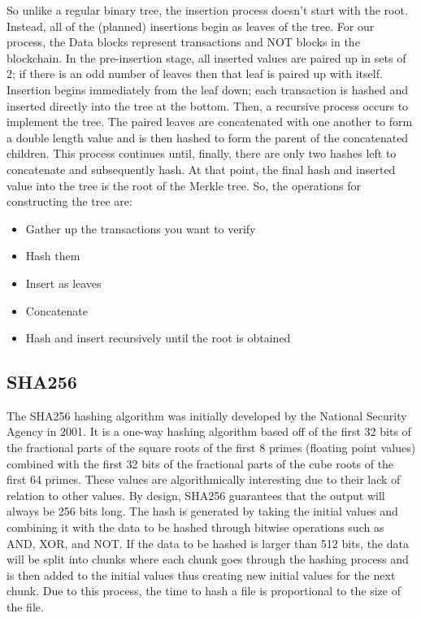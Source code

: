\documentclass[pdftex,11pt]{article}
\begin{document}
So unlike a regular binary tree, the insertion process doesn't start with the root. Instead, all of the (planned) insertions begin as leaves of the tree. For our process, the Data blocks represent transactions and NOT blocks in the blockchain. In the pre-insertion stage, all inserted values are paired up in sets of 2; if there is an odd number of leaves then that leaf is paired up with itself. Insertion begins immediately from the leaf down; each transaction is hashed and inserted directly into the tree at the bottom. Then, a recursive process occurs to implement the tree. The paired leaves are concatenated with one another to form a double length value and is then hashed to form the parent of the concatenated children. This process continues until, finally, there are only two hashes left to concatenate and subsequently hash. At that point, the final hash and inserted value into the tree is the root of the Merkle tree.
So, the operations for constructing the tree are:
\begin{itemize}
	\item Gather up the transactions you want to verify
	\item Hash them
	\item Insert as leaves
	\item Concatenate
	\item Hash and insert recursively until the root is obtained
\end{itemize}

\subsection{SHA256}
The SHA256 hashing algorithm was initially developed by the National Security Agency in 2001. It is a one-way hashing algorithm based off of the first 32 bits of the fractional parts of the square roots of the first 8 primes (floating point values) combined with the first 32 bits of the fractional parts of the cube roots of the first 64 primes. These values are algorithmically interesting due to their lack of relation to other values. By design, SHA256 guarantees that the output will always be 256 bits long. The hash is generated by taking the initial values and combining it with the data to be hashed through bitwise operations such as AND, XOR, and NOT. If the data to be hashed is larger than 512 bits, the data will be split into chunks where each chunk goes through the hashing process and is then added to the initial values thus creating new initial values for the next chunk. Due to this process, the time to hash a file is proportional to the size of the file. 
\end{document}
